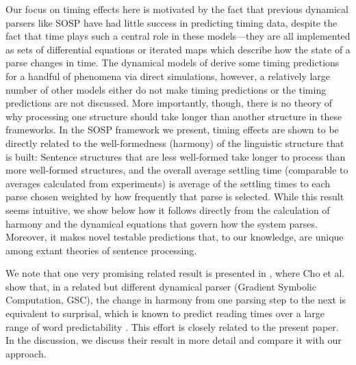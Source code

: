 \documentclass[10pt,letterpaper]{article}
\begin{document}
Our focus on timing effects here is motivated by the fact that previous dynamical parsers like SOSP have had little success in predicting timing data, despite the fact that time plays such a central role in these models---they are all implemented as sets of differential equations or iterated maps which describe how the state of a parse changes in time. The dynamical models of  derive some timing predictions for a handful of phenomena via direct simulations, however, a relatively large number of other models \cite{vandervelde2006neural, vosse2000syntactic, cho2016bifurcation, cho2017incremental, smith2018self, gerth2009unifying} either do not make timing predictions or the timing predictions are not discussed. More importantly, though, there is no theory of why processing one structure should take longer than another structure in these frameworks. In the SOSP framework we present, timing effects are shown to be directly related to the well-formedness (harmony) \cite{smolensky1986information} of the linguistic structure that is built: Sentence structures that are less well-formed take longer to process than more well-formed structures, and the overall average settling time (comparable to averages calculated from experiments) is average of the settling times to each parse chosen weighted by how frequently that parse is selected. While this result seems intuitive, we show below how it follows directly from the calculation of harmony and the dynamical equations that govern how the system parses. Moreover, it makes novel testable predictions that, to our knowledge, are unique among extant theories of sentence processing.

We note that one very promising related result is presented in , where Cho et al. show that, in a related but different dynamical parser (Gradient Symbolic Computation, GSC), the change in harmony from one parsing step to the next is equivalent to surprisal, which is known to predict reading times over a large range of word predictability \cite{hale2001probabilistic, levy2008expectation, smith2013effect}. This effort is closely related to the present paper. In the discussion, we discuss their result in more detail and compare it with our approach.%
\end{document}
